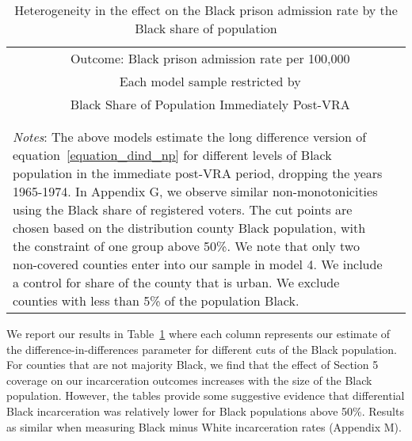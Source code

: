 \documentclass[12pt]{article}
\begin{document}
\begin{table}[t!]\centering \footnotesize
\def\sym#1{\ifmmode^{#1}\else\(^{#1}\)\fi}
	\caption{Heterogeneity in the effect on the Black prison admission rate by the Black share of population}\label{table_heterogeneous1}
	\smallskip
	\begin{tabular}{@{\extracolsep{5pt}}l*{5}{c}}
    	\noalign{\smallskip}\hline\hline\noalign{\smallskip}\noalign{\smallskip}
					&  \multicolumn{4}{c}{Outcome: Black prison admission rate per 100,000} \\
    			\cline{2-5}   \noalign{\smallskip}
					&  \multicolumn{4}{c}{Each model sample restricted by} \\
					&  \multicolumn{4}{c}{Black Share of Population Immediately Post-VRA} \\
    			 \\
	\noalign{\vspace*{-.17in}}\hline\hline\noalign{\smallskip}
    \multicolumn{5}{l}{\scriptsize \sym{*} \(p<0.1\), \sym{**} \(p<0.05\), \sym{***} \(p<0.01\)}\\
    \multicolumn{5}{p{5.1in}}{\scriptsize  \emph{Notes}: The above models estimate the long difference version of equation~\ref{equation_dind_np} for different levels of Black population in the immediate post-VRA period, dropping the years 1965-1974.  In Appendix G, we observe similar non-monotonicities using the Black share of registered voters. The cut points are chosen based on the distribution county Black population, with the constraint of one group above 50\%.  We note that only two non-covered counties enter into our sample in model 4.  We include a control for share of the county that is urban.  We exclude counties with less than 5\% of the population Black.}
\end{tabular}
\end{table}

We report our results in Table~\ref{table_heterogeneous1} where each column represents our estimate of the difference-in-differences parameter for different cuts of the Black population.  For counties that are not majority Black, we find that the effect of Section 5 coverage on our incarceration outcomes increases with the size of the Black population. However, the tables provide some suggestive evidence that differential Black incarceration was relatively lower for Black populations above 50\%. Results as similar when measuring Black minus White incarceration rates (Appendix M).
\end{document}
